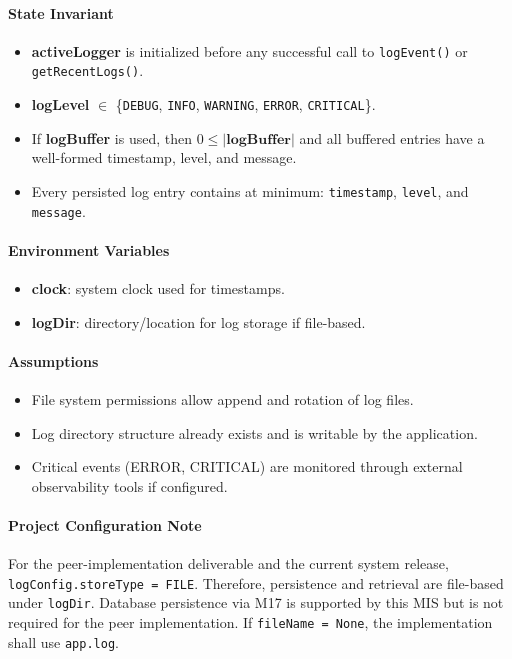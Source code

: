 \documentclass[12pt, titlepage]{article}
\begin{document}
\paragraph{State Invariant}
\begin{itemize}
  \item \textbf{activeLogger} is initialized before any successful call to \texttt{logEvent()} or \texttt{getRecentLogs()}.
  \item \textbf{logLevel} $\in$ \{\texttt{DEBUG}, \texttt{INFO}, \texttt{WARNING}, \texttt{ERROR}, \texttt{CRITICAL}\}.
  \item If \textbf{logBuffer} is used, then $0 \le |\textbf{logBuffer}|$ and all buffered entries have a well-formed timestamp, level, and message.
  \item Every persisted log entry contains at minimum: \texttt{timestamp}, \texttt{level}, and \texttt{message}.
\end{itemize}


\paragraph{Environment Variables}
\begin{itemize}
  \item \textbf{clock}: system clock used for timestamps.
  \item \textbf{logDir}: directory/location for log storage if file-based.
\end{itemize}

\paragraph{Assumptions}
\begin{itemize}
  \item File system permissions allow append and rotation of log files.
  \item Log directory structure already exists and is writable by the application.
  \item Critical events (ERROR, CRITICAL) are monitored through external observability tools if configured.
\end{itemize}

\paragraph{Project Configuration Note}
For the peer-implementation deliverable and the current system release,
\texttt{logConfig.storeType = FILE}. Therefore, persistence and retrieval are file-based under
\texttt{logDir}. Database persistence via M17 is supported by this MIS but is not required for the peer implementation.
If \texttt{fileName = None}, the implementation shall use \texttt{app.log}.
\end{document}
